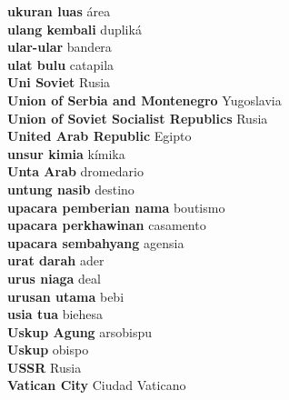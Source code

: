 \textbf{ ukuran luas  } área \\
\textbf{ ulang kembali  } dupliká \\
\textbf{ ular-ular  } bandera \\
\textbf{ ulat bulu  } catapila \\
\textbf{ Uni Soviet  } Rusia \\
\textbf{ Union of Serbia and Montenegro  } Yugoslavia \\
\textbf{ Union of Soviet Socialist Republics  } Rusia \\
\textbf{ United Arab Republic  } Egipto \\
\textbf{ unsur kimia  } kímika \\
\textbf{ Unta Arab  } dromedario \\
\textbf{ untung nasib  } destino \\
\textbf{ upacara pemberian nama  } boutismo \\
\textbf{ upacara perkhawinan  } casamento \\
\textbf{ upacara sembahyang  } agensia \\
\textbf{ urat darah  } ader \\
\textbf{ urus niaga  } deal \\
\textbf{ urusan utama  } bebi \\
\textbf{ usia tua  } biehesa \\
\textbf{ Uskup Agung  } arsobispu \\
\textbf{ Uskup  } obispo \\
\textbf{ USSR  } Rusia \\
\textbf{ Vatican City  } Ciudad Vaticano \\
